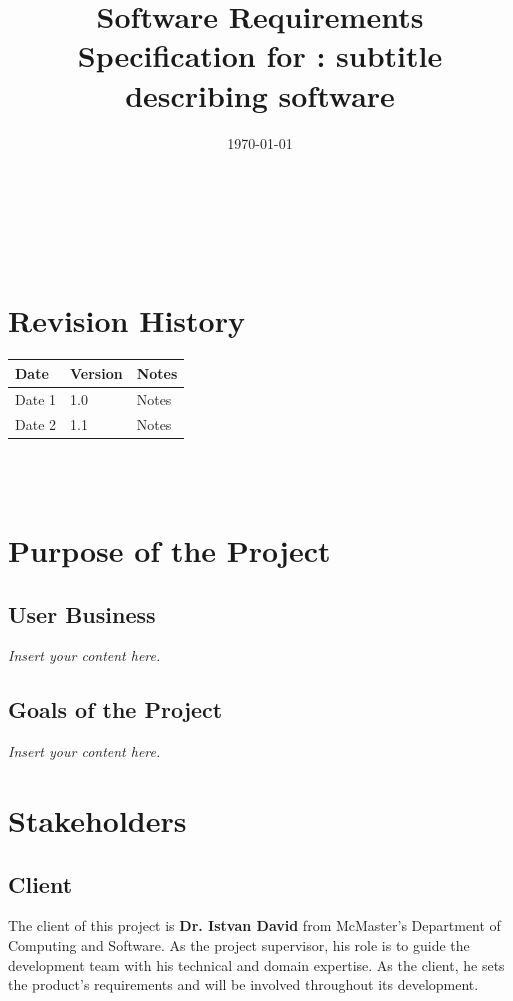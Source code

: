 \documentclass[12pt]{article}
\newcommand{\lips}{\textit{Insert your content here.}}
\begin{document}
\title{Software Requirements Specification for \progname: subtitle describing software} 
\author{\authname}
\date{\today}
	
\maketitle

~\newpage


\tableofcontents

~\newpage

\section*{Revision History}

\begin{tabularx}{\textwidth}{p{3cm}p{2cm}X}
\toprule {\textbf{Date}} & {\textbf{Version}} & {\textbf{Notes}}\\
\midrule
Date 1 & 1.0 & Notes\\
Date 2 & 1.1 & Notes\\
\bottomrule
\end{tabularx}

~\\

~\newpage
\section{Purpose of the Project}
\subsection{User Business}
\lips
\subsection{Goals of the Project}
\lips
\section{Stakeholders}
\subsection{Client}
The client of this project is \textbf{Dr. Istvan David} from McMaster's Department of Computing and Software. As the project supervisor, his role is to guide the development team with his technical and domain expertise. As the client, he sets the product's requirements and will be involved throughout its development. 
\end{document}
